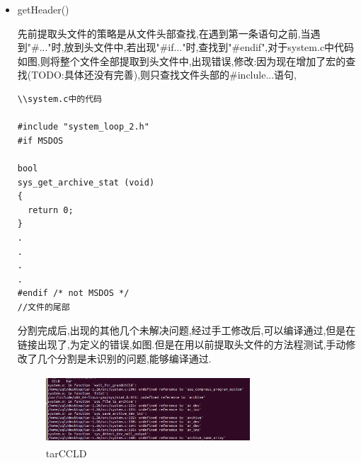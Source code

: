 \begin{itemize}
\par{现在可以将在预处理收集到的宏,写入到新的.c文件中,写的方法:}
\begin{lstlisting}
//加入源文件中有 #define N 100
//写到.c中的代码:

#ifndef N
#define N 100
#endif
\end{lstlisting}
\par{对于函数中的宏定义,出现错误,还需继续处理.}

\begin{lstlisting}
# define SUCCESSOR(name) ((name)->next)
.
.
for (cursor = list, counter = first_length - 1;
           counter;
           cursor = SUCCESSOR (cursor), counter--)
    continue;
      second_list = SUCCESSOR (cursor);
        SUCCESSOR (cursor) = 0;
.
.
#define SUCCESSOR
\end{lstlisting}
\par{先前得到MacroInfo,不能找到上述的宏定义,可能通过IdentifierInfo得到的MacroInfo,得到的宏不完全(猜测:一个IdentifierInfo对应的几个macro,从identifierInfo类找MacroInfo找的不准确),查找宏的迭代器typedef llvm::DenseMap<const IdentifierInfo *, MacroDirective*>::const\_iterator macro\_iterator,TODO:不是通过IdentifierInfo找MacroInfo,而是直接MacroDirective类直接获得宏,再由接口MacroDirective *getPrevious(),得到相关的宏.)}
\begin{lstlisting}
#include "stdio.h"
#ifndef NO
#define NO 10
#endif


#define N \
          100
int main(int argc, char **argv) {

#define N1 100
.
.
.
#undef N1
}
//输出结果:
zql@zql:~/desktop/LoopExtractor00$ ./test.sh
N  30  31
NO  5  5
//N1出现问题.

\end{lstlisting}
\item{getHeader()}

\par{先前提取头文件的策略是从文件头部查找,在遇到第一条语句之前,当遇到"\#..."时,放到头文件中,若出现"\#if..."时,查找到"\#endif",对于system.c中代码如图,则将整个文件全部提取到头文件中,出现错误,修改:因为现在增加了宏的查找(TODO:具体还没有完善),则只查找文件头部的\#inclule...语句,}
\begin{lstlisting}
\\system.c中的代码

#include "system_loop_2.h"
#if MSDOS

bool
sys_get_archive_stat (void)
{
  return 0;
}
.
.
.
.
#endif /* not MSDOS */
//文件的尾部
\end{lstlisting}
\par{分割完成后,出现的其他几个未解决问题,经过手工修改后,可以编译通过,但是在链接出现了,为定义的错误,如图.但是在用以前提取头文件的方法程测试,手动修改了几个分割是未识别的问题,能够编译通过.}
\begin{figure}
\centering
\includegraphics[width=3in,height=1in]{img/tarCCLD.png}
\caption{tarCCLD}
\label{tarCCLD}
\end{figure}



\end{itemize}
